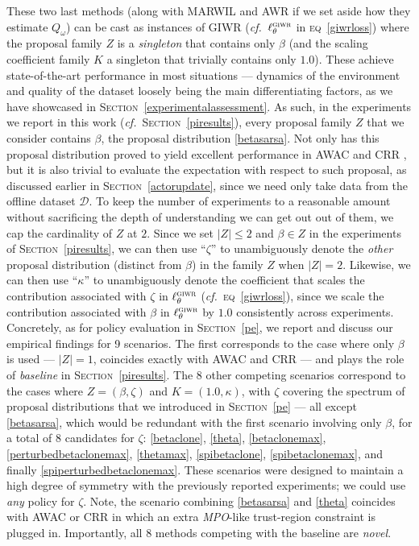 These two last methods (along with MARWIL \cite{Wang2018-dn} and AWR \cite{Peng2019-hu}
if we set aside how they estimate $Q_\omega$)
can be cast as instances of GIWR (\textit{cf.}~$\ell^\textsc{giwr}_\theta$ in \textsc{eq}~\ref{giwrloss})
where the proposal family $Z$ is a \emph{singleton} that contains only $\beta$
(and the scaling coefficient family $K$ a singleton that trivially contains only $1.0$).
These achieve state-of-the-art performance in most situations --- dynamics of the environment and
quality of the dataset loosely being the main differentiating factors,
as we have showcased in \textsc{Section}~\ref{experimentalassessment}.
As such, in the experiments we report in this work (\textit{cf.}~\textsc{Section}~\ref{piresults}),
every proposal family $Z$ that we consider contains $\beta$,
the proposal distribution \ref{betasarsa}. Not only has this proposal distribution proved to yield excellent
performance in AWAC \cite{Nair2020-gd} and CRR \cite{Wang2020-sr},
but it is also trivial to evaluate the expectation with respect to such proposal, as discussed earlier
in \textsc{Section}~\ref{actorupdate}, since we need only take data from the offline dataset
$\mathcal{D}$.
To keep the number of experiments to a reasonable amount without sacrificing the depth
of understanding we can get out out of them, we cap the cardinality of $Z$ at $2$.
Since we set $|Z| \leq 2$ and $\beta \in Z$ in the experiments of \textsc{Section}~\ref{piresults},
we can then use ``$\zeta$'' to unambiguously denote the \textit{other} proposal distribution
(distinct from $\beta$) in the family $Z$ when $|Z| = 2$.
Likewise,
we can then use ``$\kappa$'' to unambiguously denote the coefficient that scales the
contribution associated with $\zeta$ in $\ell^\textsc{giwr}_\theta$ (\textit{cf.}~\textsc{eq}~\ref{giwrloss}),
since we scale the contribution associated with $\beta$ in $\ell^\textsc{giwr}_\theta$ by $1.0$
consistently across experiments.
Concretely, as for policy evaluation in \textsc{Section}~\ref{pe}, we report and discuss our empirical findings
for 9 scenarios. The first corresponds to the case where only $\beta$ is used --- $|Z| = 1$, coincides exactly
with AWAC \cite{Nair2020-gd} and CRR \cite{Wang2020-sr} ---
and plays the role of \textit{baseline} in \textsc{Section}~\ref{piresults}.
The 8 other competing scenarios correspond to the cases where $Z = (\beta, \zeta)$
and $K = (1.0, \kappa)$, with
$\zeta$ covering the spectrum of proposal distributions that we introduced in \textsc{Section}~\ref{pe}
--- all except \ref{betasarsa}, which would be redundant with the first scenario involving only $\beta$,
for a total of 8 candidates for $\zeta$:
\ref{betaclone}, \ref{theta},
\ref{betaclonemax}, \ref{perturbedbetaclonemax}, \ref{thetamax},
\ref{spibetaclone}, \ref{spibetaclonemax}, and finally \ref{spiperturbedbetaclonemax}.
These scenarios were designed to maintain a high degree of symmetry with the previously reported experiments;
we could use \emph{any} policy for $\zeta$.
Note, the scenario combining \ref{betasarsa} and \ref{theta} coincides
with AWAC \cite{Nair2020-gd} or CRR \cite{Wang2020-sr}
in which an extra \textit{MPO}-like trust-region constraint \cite{Abdolmaleki2018-sp} is plugged in.
Importantly, all 8 methods competing with the baseline are \emph{novel}.

